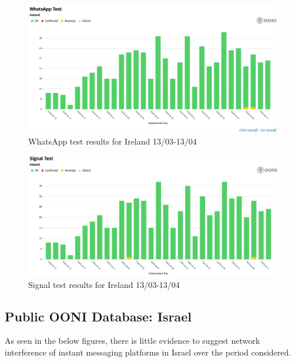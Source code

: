 \begin{figure} [H]
    \centering
    \includegraphics[width=0.5\linewidth]{IREOONIDBIMWHATS.png}
    \caption{WhatsApp test results for Ireland 13/03-13/04}
    \label{fig:enter-label}
\end{figure}

\begin{figure} [H]
    \centering
    \includegraphics[width=0.5\linewidth]{IREOONIDBSIG.png}
    \caption{Signal test results for Ireland 13/03-13/04}
    \label{fig:enter-label}
\end{figure}



\subsection{Public OONI Database: Israel}
As seen in the below figures, there is little evidence to suggest network interference of instant messaging platforms in Israel over the period considered.


